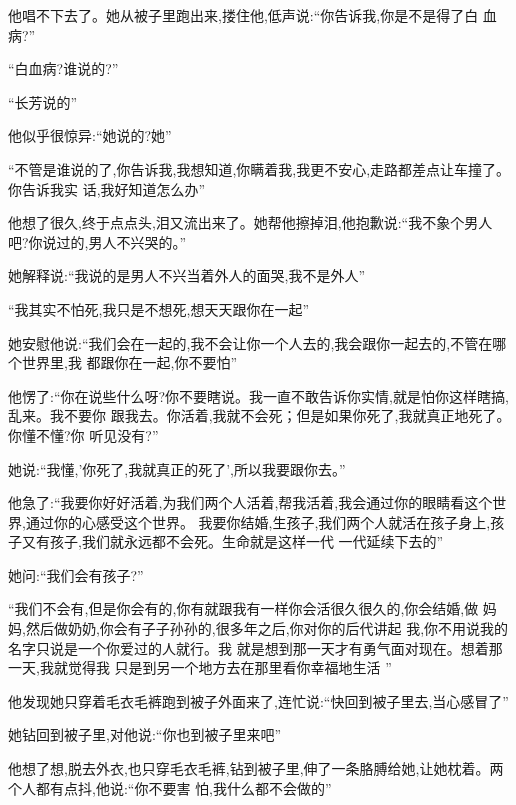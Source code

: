 ﻿\documentclass[12pt]{article}
\begin{document}
他唱不下去了。她从被子里跑出来,搂住他,低声说:``你\myrule 告诉我,你是不是\myrule 得了\myrule 白
\myrule 血病?''

``白血病?谁\myrule 说的?''

``长芳说的\myrule ''

他似乎很惊异:``她\myrule 说的?她\myrule ''

``不管是谁说的了,你告诉我,我想知道\myrule ,你瞒着我,我更\myrule 不安心,走路都差点让车撞了。你告诉我实
话,我好\myrule 知道怎么办\myrule ''

他想了很久,终于点点头,泪又流出来了。她帮他擦掉泪,他抱歉说:``我不象个男人吧?你说过的,男人不兴哭的。''

她解释说:``我说的是\myrule 男人不兴\myrule 当着外人的面哭\myrule ,我不是外人\myrule ''

``我\myrule 其实不怕死,我只是\myrule 不想死,想天天跟你在一起\myrule ''

她安慰他说:``我们会在一起的,我不会让你一个人\myrule 去的,我会跟你一起去的\myrule ,不管在哪个世界里,我
都跟你在一起,你不要怕\myrule ''

他愣了:``你在说些什么呀?你不要瞎说。我一直不敢告诉你实情,就是怕你这样\myrule 瞎搞,乱来。我不要你
\myrule 跟我去。你活着,我就不会死；但是如果你\myrule 死了,我就\myrule 真正地\myrule 死了。你懂不懂?你
听见没有?''

她说:``我懂,'你死了,我就真正的死了',所以我要跟你去。''

他急了:``我要你好好活着,为我们两个人活着,帮我活着,我会通过你的眼睛看这个世界,通过你的心感受这个世界。
我要你\myrule 结婚,生孩子,我们两个人就活在孩子身上,孩子又有孩子,我们就永远都不会死。生命就是这样一代
一代延续下去的\myrule ''

她问:``我们\myrule 会有\myrule 孩子?''

``我们不会有,但是你\myrule 会有的,你有就跟我有一样\myrule 你会活很久很久的,你会\myrule 结婚,做
\myrule 妈妈\myrule ,然后做\myrule 奶奶,你会有子子孙孙的\myrule ,很多年之后,你\myrule 对你的后代讲起
\myrule 我,你\myrule 不用说我的名字\myrule 只说是一个你\myrule 爱过的人\myrule 就行\myrule 。我
\myrule 就是想到\myrule 那一天\myrule 才有勇气\myrule 面对\myrule 现在\myrule 。想着那一天,我就觉得我
\myrule 只是\myrule 到另一个\myrule 地方\myrule 去\myrule 在那里\myrule 看你\myrule 幸福地生活
\myrule ''

他发现她只穿着毛衣毛裤跑到被子外面来了,连忙说:``快回到被子里去,当心感冒了\myrule ''

她钻回到被子里,对他说:``你\myrule 也到被子里来吧\myrule ''

他想了想,脱去外衣,也只穿毛衣毛裤,钻到被子里,伸了一条胳膊给她,让她枕着。两个人都有点抖,他说:``你不要害
怕,我\myrule 什么都不会\myrule 做的\myrule ''
\end{document}
